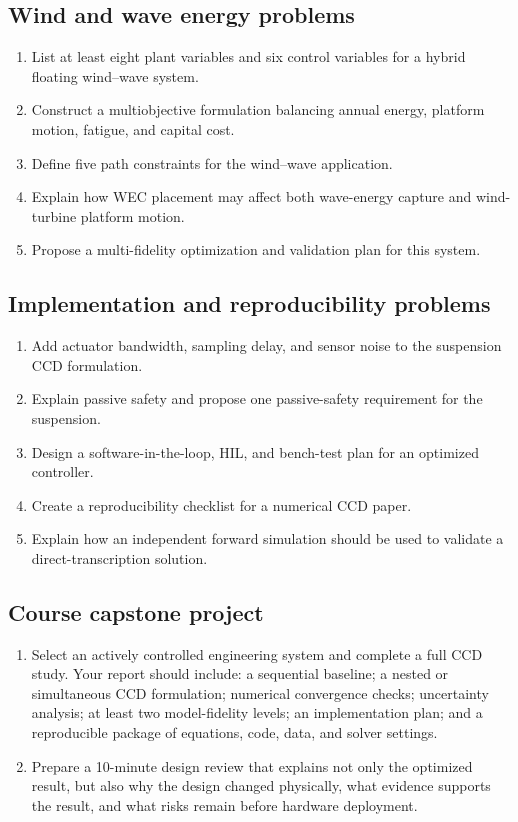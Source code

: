 \documentclass[11pt]{article}
\begin{document}
\subsection*{Wind and wave energy problems}
\begin{enumerate}[leftmargin=1.5em,label=\textbf{P\arabic*.},resume]
  \item List at least eight plant variables and six control variables for a hybrid floating wind--wave system.
  \item Construct a multiobjective formulation balancing annual energy, platform motion, fatigue, and capital cost.
  \item Define five path constraints for the wind--wave application.
  \item Explain how WEC placement may affect both wave-energy capture and wind-turbine platform motion.
  \item Propose a multi-fidelity optimization and validation plan for this system.
\end{enumerate}

\subsection*{Implementation and reproducibility problems}
\begin{enumerate}[leftmargin=1.5em,label=\textbf{P\arabic*.},resume]
  \item Add actuator bandwidth, sampling delay, and sensor noise to the suspension CCD formulation.
  \item Explain passive safety and propose one passive-safety requirement for the suspension.
  \item Design a software-in-the-loop, HIL, and bench-test plan for an optimized controller.
  \item Create a reproducibility checklist for a numerical CCD paper.
  \item Explain how an independent forward simulation should be used to validate a direct-transcription solution.
\end{enumerate}

\subsection*{Course capstone project}
\begin{enumerate}[leftmargin=1.5em,label=\textbf{P\arabic*.},resume]
  \item Select an actively controlled engineering system and complete a full CCD study. Your report should include: a sequential baseline; a nested or simultaneous CCD formulation; numerical convergence checks; uncertainty analysis; at least two model-fidelity levels; an implementation plan; and a reproducible package of equations, code, data, and solver settings.
  \item Prepare a 10-minute design review that explains not only the optimized result, but also why the design changed physically, what evidence supports the result, and what risks remain before hardware deployment.
\end{enumerate}
\end{document}
